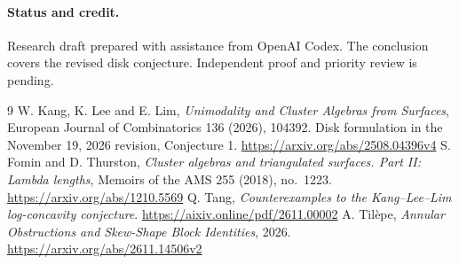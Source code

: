 \documentclass[11pt]{article}
\begin{document}
\paragraph{Status and credit.} Research draft prepared with assistance from
OpenAI Codex. The conclusion covers the revised disk conjecture. Independent
proof and priority review is pending.
\begin{thebibliography}{9}
 W. Kang, K. Lee and E. Lim, \emph{Unimodality and Cluster
Algebras from Surfaces}, European Journal of Combinatorics 136 (2026),
104392. Disk formulation in the November 19, 2026 revision, Conjecture 1.
\url{https://arxiv.org/abs/2508.04396v4}
 S. Fomin and D. Thurston, \emph{Cluster algebras and
triangulated surfaces. Part II: Lambda lengths}, Memoirs of the AMS 255
(2018), no.~1223. \url{https://arxiv.org/abs/1210.5569}
 Q. Tang, \emph{Counterexamples to the Kang--Lee--Lim
log-concavity conjecture}. \url{https://aixiv.online/pdf/2611.00002}
 A. Til\`epe, \emph{Annular Obstructions and Skew-Shape
Block Identities}, 2026. \url{https://arxiv.org/abs/2611.14506v2}
\end{thebibliography}
\end{document}
